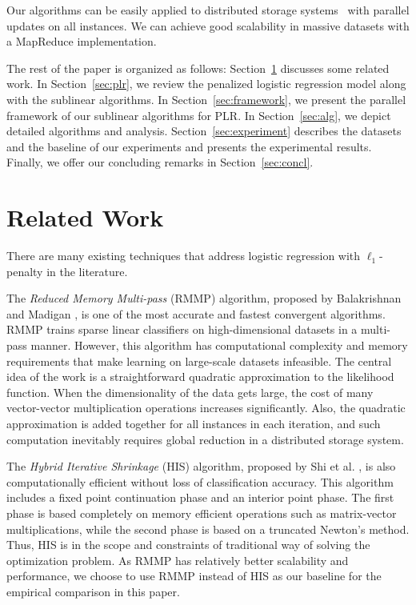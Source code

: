 \documentclass{llncs}
\begin{document}
Our algorithms can be easily applied to distributed storage systems~\cite{hogan1990livermore} with parallel updates on all instances.
We can achieve good scalability in massive datasets with a MapReduce implementation.
	
The rest of the paper is organized as follows:
Section~\ref{sec:rew} discusses some related work.
In Section~\ref{sec:plr}, we review the penalized logistic regression model along with the sublinear algorithms.
In Section~\ref{sec:framework}, we present the parallel framework of our sublinear algorithms for PLR.
In Section~\ref{sec:alg}, we depict detailed algorithms and analysis.
Section~\ref{sec:experiment} describes the datasets and the baseline of our experiments and presents the experimental results.
Finally, we offer our concluding remarks in Section~\ref{sec:concl}.

\section{Related Work} \label{sec:rew}
There are many existing techniques that address logistic regression with $\ell_1$-penalty in the literature.

The \textit{Reduced Memory Multi-pass} (RMMP) algorithm, proposed by Balakrishnan and Madigan \cite{balakrishnan2008algorithms}, is one of the most accurate and fastest convergent algorithms.
RMMP trains sparse linear classifiers on high-dimensional datasets in a multi-pass manner.
However, this algorithm has computational complexity and memory requirements that make learning on large-scale datasets infeasible.
The central idea of the work is a straightforward quadratic approximation to the likelihood function.
When the dimensionality of the data gets large, the cost of many vector-vector multiplication operations increases significantly.
Also, the quadratic approximation is added together for all instances in each iteration, and such computation inevitably requires global reduction in a distributed storage system.

The \textit{Hybrid Iterative Shrinkage} (HIS) algorithm, proposed by Shi et al. \cite{shi2008fast}, is also computationally efficient without loss of classification accuracy.
This algorithm includes a fixed point continuation phase and an interior point phase.
The first phase is based completely on memory efficient operations such as matrix-vector multiplications, while the second phase is based on a truncated Newton's method.
Thus, HIS is in the scope and constraints of traditional way of solving the optimization problem.
As RMMP has relatively better scalability and performance, we choose to use RMMP instead of HIS as our baseline for the empirical comparison in this paper.
\end{document}
